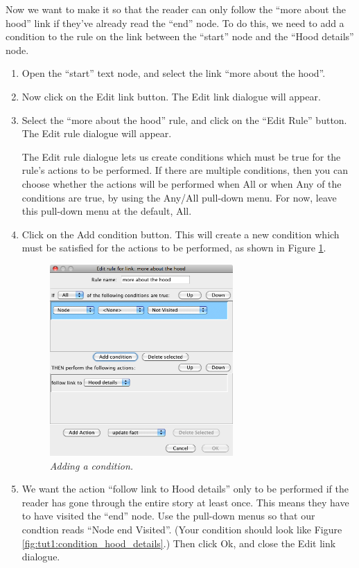 \documentclass{article}
\begin{document}
Now we want to make it so that the reader can only follow the ``more about the
hood'' link if they've already read the ``end'' node. To do this, we need to
add a condition to the rule on the link between the ``start'' node and the
``Hood details'' node.

\begin{enumerate}
  \item Open the ``start'' text node, and select the link ``more about the
  hood''.
  \item Now click on the Edit link button. The Edit link dialogue will appear.
  \item Select the ``more about the hood'' rule, and click on the ``Edit Rule''
  button. The Edit rule dialogue will appear.

The Edit rule dialogue lets us create conditions which must be true for the
rule's actions to be performed. If there are multiple conditions, then you can
choose whether the actions will be performed when All or when Any of the
conditions are true, by using the Any/All pull-down menu. For now, leave this
pull-down menu at the default, All.

\item Click on the Add condition button. This will create a new condition which
must be satisfied for the actions to be performed, as shown in Figure
\ref{fig:tut1:adding_condition}.
 
\begin{figure}[ht]
  \centering
  \includegraphics[width=7cm]{images/hypedyn-tutorial-1-figure-13}
  \caption{\textit{Adding a condition.}}
  \label{fig:tut1:adding_condition}
\end{figure} 

\item We want the action ``follow link to Hood details'' only to be performed if
the reader has gone through the entire story at least once. This means they have
to have visited the ``end'' node. Use the pull-down menus so that our condtion
reads ``Node end Visited''. (Your condition should look like Figure
\ref{fig:tut1:condition_hood_details}.) Then click Ok, and close the Edit link
dialogue.


\end{enumerate}
\end{document}
